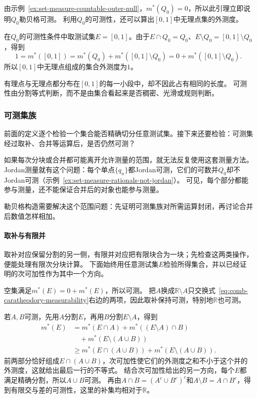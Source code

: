 由示例~\ref{ex:set-measure-countable-outer-null}，$m^*(Q_0)=0$，所以此引理立即说明$Q_0$勒贝格可测。
利用$Q_0$的可测性，还可以算出$[0,1]$中无理点集的外测度。
\begin{example}[单位区间中无理点的外测度]
\label{ex:set-measure-irrationals-outer-measure}
在$Q_0$的可测性条件中取测试集$E=[0,1]$。由于$E\cap Q_0=Q_0$、$E\setminus Q_0=[0,1]\setminus Q_0$，得到
\[
 1=m^*([0,1])=m^*(Q_0)+m^*([0,1]\setminus Q_0)=0+m^*([0,1]\setminus Q_0).
\]
所以$[0,1]$中无理点组成的集合外测度为$1$。
\end{example}

有理点与无理点都分布在$[0,1]$的每一小段中，却不因此占有相同的长度。
可测性由分割等式判断，而不是由集合看起来是否稠密、光滑或规则判断。

\subsubsection{可测集族}

前面的定义逐个检验一个集合能否精确切分任意测试集。接下来还要检验：可测集经过取补、合并等运算后，是否仍然可测？

如果每次分块或合并都可能离开允许测量的范围，就无法反复使用这套测量方法。
Jordan测量就有这个问题：每个单点$\{q_n\}$都Jordan可测，它们的可数并$Q_0$却不Jordan可测（示例~\ref{ex:set-measure-rationals-not-jordan}）。
可见，每个部分都能参与测量，还不能保证合并后的对象也能参与测量。

勒贝格构造需要解决这个范围问题：先证明可测集族对所需运算封闭，再讨论合并后数值怎样相加。

\paragraph{取补与有限并}

取补对应保留分割的另一侧，有限并对应把有限块合为一块；先检查这两类操作，便能处理有限次分块计算。
下面始终用任意测试集$E$检验所得集合，并以已经证明的次可加性作为其中一个方向。

空集满足$m^*(E)=0+m^*(E)$，所以可测。
把$A$换成$\mathbb R\setminus A$只交换式~\eqref{eq:comb-caratheodory-measurability}右边的两项，因此取补保持可测，特别地$\mathbb R$也可测。

若$A,B$可测，先用$A$分割$E$，再用$B$分割$E\setminus A$，得到
\[
 \begin{aligned}
 m^*(E)&=m^*(E\cap A)+m^*((E\setminus A)\cap B)\\
 &\quad +m^*(E\setminus(A\cup B))\\
 &\geq m^*(E\cap(A\cup B))+m^*(E\setminus(A\cup B)).
 \end{aligned}
\]
前两部分恰好组成$E\cap(A\cup B)$，次可加性使它们的外测度之和不小于这个并的外测度，这就给出最后一行的不等式。
结合次可加性给出的另一方向，每个$E$都满足精确分割，所以$A\cup B$可测。
再由$A\cap B=(A^c\cup B^c)^c$和$A\setminus B=A\cap B^c$，得到有限交与差的可测性，这里的补集均相对于$\mathbb R$。

